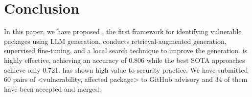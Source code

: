 \section{Conclusion}\label{sec:conclusion}
In this paper, we have proposed \detector{}, the first framework for identifying vulnerable packages using LLM generation. \detector{} conducts retrieval-augmented generation, supervised fine-tuning, and a local search technique to improve the generation. \detector{} is highly effective, achieving an accuracy of 0.806 while the best SOTA approaches achieve only 0.721.
\detector{} has shown high value to security practice. 
We have submitted 60 pairs of <vulnerability, affected package> to GitHub advisory and 34 of them have been accepted and merged. 